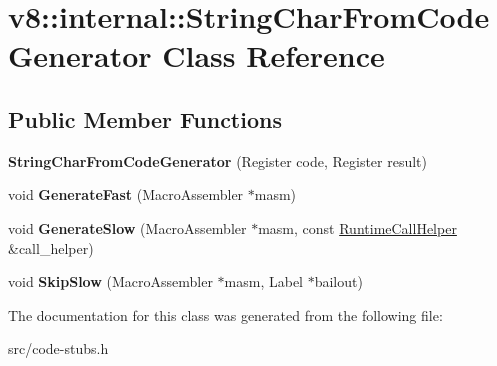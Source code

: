 \hypertarget{classv8_1_1internal_1_1_string_char_from_code_generator}{}\section{v8\+:\+:internal\+:\+:String\+Char\+From\+Code\+Generator Class Reference}
\label{classv8_1_1internal_1_1_string_char_from_code_generator}
\subsection*{Public Member Functions}
\begin{DoxyCompactItemize}
\item 
\hypertarget{classv8_1_1internal_1_1_string_char_from_code_generator_aeed226f9954bf9d526c4b6116aacfc0c}{}{\bfseries String\+Char\+From\+Code\+Generator} (Register code, Register result)\label{classv8_1_1internal_1_1_string_char_from_code_generator_aeed226f9954bf9d526c4b6116aacfc0c}

\item 
\hypertarget{classv8_1_1internal_1_1_string_char_from_code_generator_a46b894ffbc5a4aed0858cfc9d927e995}{}void {\bfseries Generate\+Fast} (Macro\+Assembler $\ast$masm)\label{classv8_1_1internal_1_1_string_char_from_code_generator_a46b894ffbc5a4aed0858cfc9d927e995}

\item 
\hypertarget{classv8_1_1internal_1_1_string_char_from_code_generator_af303b2427779d7359451eec05807c018}{}void {\bfseries Generate\+Slow} (Macro\+Assembler $\ast$masm, const \hyperlink{classv8_1_1internal_1_1_runtime_call_helper}{Runtime\+Call\+Helper} \&call\+\_\+helper)\label{classv8_1_1internal_1_1_string_char_from_code_generator_af303b2427779d7359451eec05807c018}

\item 
\hypertarget{classv8_1_1internal_1_1_string_char_from_code_generator_a670e4c0bf49709c60f6d369df49fadbc}{}void {\bfseries Skip\+Slow} (Macro\+Assembler $\ast$masm, Label $\ast$bailout)\label{classv8_1_1internal_1_1_string_char_from_code_generator_a670e4c0bf49709c60f6d369df49fadbc}

\end{DoxyCompactItemize}


The documentation for this class was generated from the following file\+:\begin{DoxyCompactItemize}
\item 
src/code-\/stubs.\+h\end{DoxyCompactItemize}
